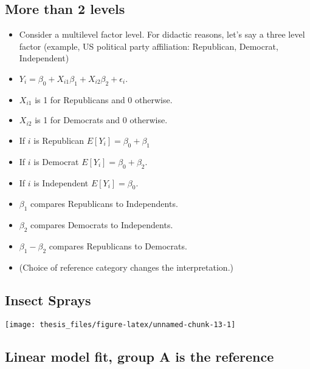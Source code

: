 \documentclass[12pt,openright,oneside,a4paper,chapter=TITLE,section=TITLE,subsection=Title,english,french,spanish,portugues,sumario=tradicional]{04-class-files/abntex2}
\newenvironment{Shaded}{\begin{snugshade}}{\end{snugshade}}
\newcommand{\DataTypeTok}[1]{\textcolor[rgb]{0.13,0.29,0.53}{#1}}
\newcommand{\KeywordTok}[1]{\textcolor[rgb]{0.13,0.29,0.53}{\textbf{#1}}}
\newcommand{\NormalTok}[1]{#1}
\newcommand{\OperatorTok}[1]{\textcolor[rgb]{0.81,0.36,0.00}{\textbf{#1}}}
\newcommand{\StringTok}[1]{\textcolor[rgb]{0.31,0.60,0.02}{#1}}
\providecommand{\tightlist}{%
  \setlength{\itemsep}{0pt}\setlength{\parskip}{0pt}}
\begin{document}
\hypertarget{more-than-2-levels}{%
\subsection{More than 2 levels}\label{more-than-2-levels}}

\begin{itemize}
\tightlist
\item
  Consider a multilevel factor level. For didactic reasons, let's say a three level factor (example, US political party affiliation: Republican, Democrat, Independent)
\item
  \(Y_i = \beta_0 + X_{i1} \beta_1 + X_{i2} \beta_2 + \epsilon_i\).
\item
  \(X_{i1}\) is 1 for Republicans and 0 otherwise.
\item
  \(X_{i2}\) is 1 for Democrats and 0 otherwise.
\item
  If \(i\) is Republican \(E[Y_i] = \beta_0 +\beta_1\)
\item
  If \(i\) is Democrat \(E[Y_i] = \beta_0 + \beta_2\).
\item
  If \(i\) is Independent \(E[Y_i] = \beta_0\).
\item
  \(\beta_1\) compares Republicans to Independents.
\item
  \(\beta_2\) compares Democrats to Independents.
\item
  \(\beta_1 - \beta_2\) compares Republicans to Democrats.
\item
  (Choice of reference category changes the interpretation.)
\end{itemize}

\hypertarget{insect-sprays}{%
\subsection{Insect Sprays}\label{insect-sprays}}

\begin{center}\texttt{[image: thesis\_files/figure-latex/unnamed-chunk-13-1]} \end{center}

\hypertarget{linear-model-fit-group-a-is-the-reference}{%
\subsection{Linear model fit, group A is the reference}\label{linear-model-fit-group-a-is-the-reference}}

\begin{Shaded}
\end{Shaded}
\end{document}
